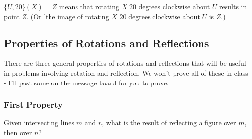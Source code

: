 









$\{U, 20\} (X) = Z$ means that rotating $X$ $20$ degrees clockwise about $U$ results in point $Z.$ (Or 'the image of rotating $X$ $20$ degrees clockwise about $U$ is $Z$.)

\subsection{Properties of Rotations and Reflections}
There are three general properties of rotations and reflections that will be useful in problems involving rotation and reflection.  We won't prove all of these in class - I'll post some on the message board for you to prove.

\subsubsection{First Property}
Given intersecting lines $m$ and $n$, what is the result of reflecting a figure over $m$, then over $n$?    

